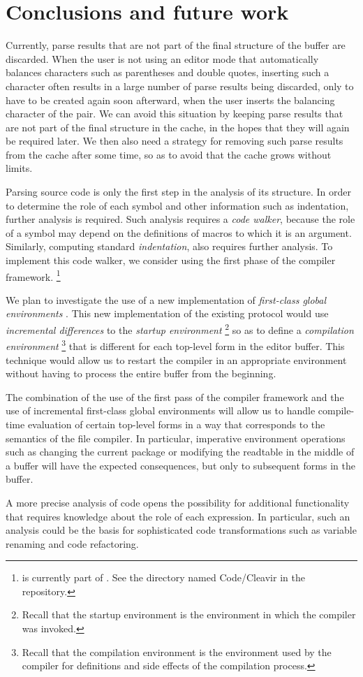 \section{Conclusions and future work}

Currently, parse results that are not part of the final structure of
the buffer are discarded.  When the user is not using an editor mode
that automatically balances characters such as parentheses and double
quotes, inserting such a character often results in a large number of
parse results being discarded, only to have to be created again soon
afterward, when the user inserts the balancing character of the pair.
We can avoid this situation by keeping parse results that are not part
of the final structure in the cache, in the hopes that they will again
be required later.  We then also need a strategy for removing such
parse results from the cache after some time, so as to avoid that the
cache grows without limits.

Parsing \commonlisp{} source code is only the first step in the
analysis of its structure.  In order to determine the role of each
symbol and other information such as indentation, further analysis is
required.  Such analysis requires a \emph{code walker}, because the
role of a symbol may depend on the definitions of macros to which it
is an argument.  Similarly, computing standard
\emph{indentation}, also requires further analysis.  To implement this
code walker, we consider using the first phase of the \cleavir{}
compiler framework.%
\footnote{\cleavir{} is currently part of \sicl{}.  See the directory
  named Code/Cleavir in the \sicl{} repository.}

We plan to investigate the use of a new implementation of
\emph{first-class global environments}
\cite{Strandh:2015:ELS:Environments}.  This new implementation of the
existing \clos{} protocol would use \emph{incremental differences} to
the \emph{startup environment}%
\footnote{Recall that the startup environment is the environment in
  which the compiler was invoked.}
so as to define a \emph{compilation environment}%
\footnote{Recall that the compilation environment is the environment
  used by the compiler for definitions and side effects of the
  compilation process.}
that is different for each top-level form in the editor buffer.  This
technique would allow us to restart the compiler in an appropriate
environment without having to process the entire buffer from the
beginning.

The combination of the use of the first pass of the \cleavir{}
compiler framework and the use of incremental first-class global
environments will allow us to handle compile-time evaluation of
certain top-level forms in a way that corresponds to the semantics of
the file compiler.  In particular, imperative environment operations
such as changing the current package or modifying the readtable in the
middle of a buffer will have the expected consequences, but only to
subsequent forms in the buffer.

A more precise analysis of \commonlisp{} code opens the
possibility for additional functionality that requires knowledge about
the role of each expression.  In particular, such an analysis could be
the basis for sophisticated code transformations such as variable
renaming and code refactoring.

